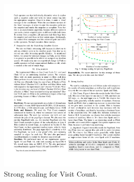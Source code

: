 \begin{figure}[h]
\centering
\includegraphics[width=0.6\textwidth]{./img/strong_scaling.pdf}
\caption{Strong scaling for Visit Count\cite{GevayRBMQM21}.}
\end{figure}




